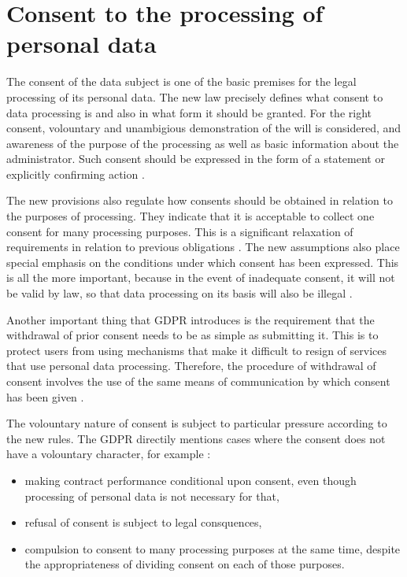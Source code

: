 \documentclass[en, noamssymb]{mgr}
\begin{document}
\section{Consent to the processing of personal data}

The consent of the data subject is one of the basic premises for the legal processing of its personal data. The new law precisely defines what consent to data processing is and also in what form it should be granted. For the right consent, volountary and unambigious demonstration of the will is considered, and awareness of the purpose of the processing as well as basic information about the administrator. Such consent should be expressed in the form of a statement or explicitly confirming action \cite{blog_zgoda}.

\indent The new provisions also regulate how consents should be obtained in relation to the purposes of processing. They indicate that it is acceptable to collect one consent for many processing purposes. This is a significant relaxation of requirements in relation to previous obligations \cite{blog_zgoda}. The new assumptions also place special emphasis on the conditions under which consent has been expressed. This is all the more important, because in the event of inadequate consent, it will not be valid by law, so that data processing on its basis will also be illegal \cite{blog_zgoda}.

\indent Another important thing that GDPR introduces is the requirement that the withdrawal of prior consent needs to be as simple as submitting it. This is to protect users from using mechanisms that make it difficult to resign of services that use personal data processing. Therefore, the procedure of withdrawal of consent involves the use of the same means of communication by which consent has been given \cite{blog_zgoda}. 

\indent The volountary nature of consent is subject to particular pressure according to the new rules. The GDPR directily mentions cases where the consent does not have a volountary character, for example \cite{blog_zgoda}:

\begin{itemize}

\item making contract performance conditional upon consent, even though processing of personal data is not necessary for that,

\item refusal of consent is subject to legal consquences,

\item compulsion to consent to many processing purposes at the same time, despite the appropriateness of dividing consent on each of those purposes.

\end{itemize}
\end{document}
